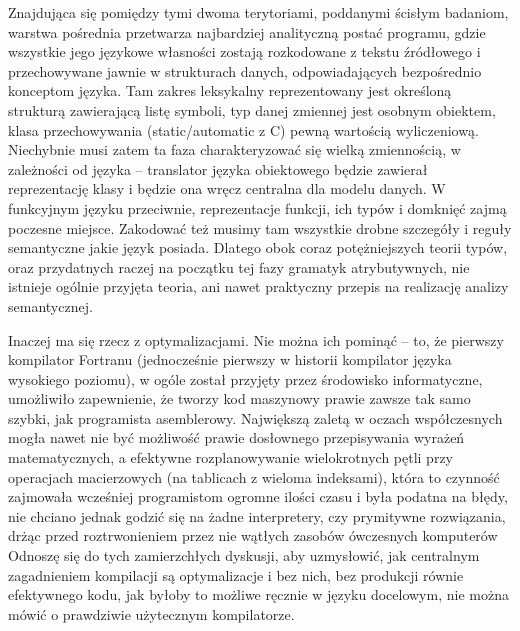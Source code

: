 Znajdująca się pomiędzy tymi dwoma terytoriami, poddanymi ścisłym badaniom, warstwa pośrednia przetwarza najbardziej analityczną postać programu, gdzie wszystkie jego językowe własności zostają rozkodowane z tekstu źródłowego i przechowywane jawnie w strukturach danych, odpowiadających bezpośrednio konceptom języka. Tam zakres leksykalny reprezentowany jest określoną strukturą zawierającą listę symboli, typ danej zmiennej jest osobnym  obiektem, klasa przechowywania (static/automatic z C) pewną wartością wyliczeniową. Niechybnie musi zatem ta faza charakteryzować się wielką zmiennością, w zależności od języka – translator języka obiektowego będzie zawierał reprezentację klasy i będzie ona wręcz centralna dla modelu danych. W funkcyjnym języku przeciwnie, reprezentacje funkcji, ich typów i domknięć zajmą poczesne miejsce. Zakodować też musimy tam wszystkie drobne szczegóły i reguły semantyczne jakie język posiada. Dlatego obok coraz potężniejszych teorii typów, oraz przydatnych raczej na początku tej fazy gramatyk atrybutywnych, nie istnieje ogólnie przyjęta teoria, ani nawet praktyczny przepis na realizację analizy semantycznej.

Inaczej ma się rzecz z optymalizacjami. Nie można ich pominąć – to, że pierwszy kompilator Fortranu (jednocześnie pierwszy w historii kompilator języka wysokiego poziomu), w ogóle został przyjęty przez środowisko informatyczne, umożliwiło zapewnienie, że tworzy kod maszynowy prawie zawsze tak samo szybki, jak programista asemblerowy. Największą zaletą w oczach współczesnych mogła nawet nie być możliwość prawie dosłownego przepisywania wyrażeń matematycznych, a efektywne rozplanowywanie wielokrotnych pętli przy operacjach macierzowych (na tablicach z wieloma indeksami), która to czynność zajmowała wcześniej programistom ogromne ilości czasu i była podatna na błędy, nie chciano jednak godzić się na żadne interpretery, czy prymitywne rozwiązania, drżąc przed roztrwonieniem przez nie wątłych zasobów ówczesnych komputerów\cite{FORTRAN_AUTOMATIC_CODING_SYSTEM}
Odnoszę się do tych zamierzchłych dyskusji, aby uzmysłowić, jak centralnym zagadnieniem kompilacji są optymalizacje i bez nich, bez produkcji równie efektywnego kodu, jak byłoby to możliwe ręcznie w języku docelowym, nie można mówić o prawdziwie użytecznym  kompilatorze.

